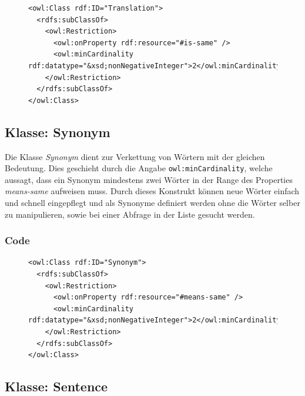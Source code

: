 \documentclass[
    11pt,
    latin1,
    a4paper,
    oneside
]{scrreprt}
\begin{document}
\begin{figure}[H]
 \lstset{language=XML}
 \begin{lstlisting}[label=owl:translation,caption={Die Klasse \emph{Translation} beinhaltet alle \"Ubersetzungen eines Wortes}]
<owl:Class rdf:ID="Translation">
  <rdfs:subClassOf>
    <owl:Restriction>
      <owl:onProperty rdf:resource="#is-same" />
      <owl:minCardinality rdf:datatype="&xsd;nonNegativeInteger">2</owl:minCardinality>
    </owl:Restriction>
  </rdfs:subClassOf>
</owl:Class>
 \end{lstlisting}
\end{figure}

\subsection{Klasse: Synonym} \label{sec:class_synonym}

Die Klasse \emph{Synonym} dient zur Verkettung von W\"ortern mit der gleichen Bedeutung. Dies geschieht durch die Angabe \texttt{owl:minCardinality}, welche aussagt, dass ein Synonym mindestens zwei W\"orter in der Range des Properties \emph{means-same} aufweisen muss. Durch dieses Konstrukt k\"onnen neue W\"orter einfach und schnell eingepflegt und als Synonyme definiert werden ohne die W\"orter selber zu manipulieren, sowie bei einer Abfrage in der Liste gesucht werden.

\subsubsection{Code}  \label{sec:class_synonym_code}

\begin{figure}[H]
 \lstset{language=XML}
 \begin{lstlisting}[label=owl:synonym,caption={Die Klasse \emph{Synonym} beinhaltet alle W\"orter dir etwas \"ahnliches bedeuten}]
<owl:Class rdf:ID="Synonym">
  <rdfs:subClassOf>
    <owl:Restriction>
      <owl:onProperty rdf:resource="#means-same" />
      <owl:minCardinality rdf:datatype="&xsd;nonNegativeInteger">2</owl:minCardinality>
    </owl:Restriction>
  </rdfs:subClassOf>
</owl:Class>
 \end{lstlisting}
\end{figure}

\subsection{Klasse: Sentence} \label{sec:class_sentence}
\end{document}
